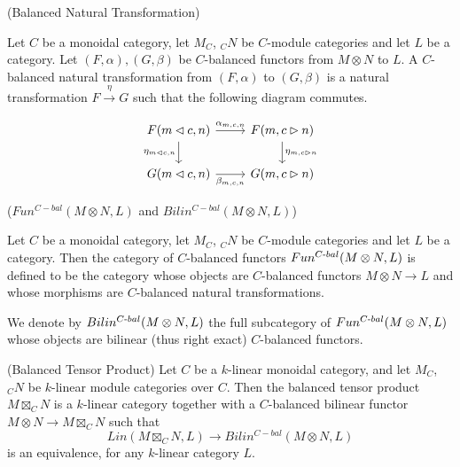 \begin{definition} (Balanced Natural Transformation)

  \noindent Let $C$ be a monoidal category, let $M_{C}$, $_{C}N$ be $C$-module categories and let $L$ be a category. Let $(F,\alpha), (G,\beta)$ be $C$-balanced functors from $M \otimes N$ to $L$. A $C$-balanced natural transformation
  from $(F,\alpha)$ to $(G,\beta)$ is a natural transformation $ F \xrightarrow{\eta} G$ such
  that the following diagram commutes.

  \[
    \begin{tikzcd}
      F(m \lhd c, n) \arrow[r, "\alpha_{m,c,n}"] \arrow[d, "\eta_{m \lhd c, n}"'] &
      F(m, c \rhd n) \arrow[d, "\eta_{m, c \rhd n}"] \\
      G(m \lhd c, n) \arrow[r, "\beta_{m,c,n}"'] &
      G(m, c \rhd n)
    \end{tikzcd}
  \]
\end{definition}

\begin{definition} ($Fun^{C-bal}(M \otimes N, L)$ and $Bilin^{C-bal}(M \otimes N, L)$)

  \noindent Let $C$ be a monoidal category, let $M_{C}$, $_{C}N$ be $C$-module categories and let $L$ be a category. \quad Then the category of $C$-balanced functors
  $Fun^{C{\text -}bal}(M \otimes N, L)$ is defined to be the category whose
  objects are $C$-balanced functors
  $M \otimes N \to L$ and whose morphisms are $C$-balanced natural transformations.

 We denote by $Bilin^{C{\text -}bal}(M \otimes N, L)$ the full subcategory of $Fun^{C{\text -}bal}(M \otimes N, L)$ whose objects are bilinear (thus right exact) $C$-balanced functors.
\end{definition}

\begin{definition}\label{definition/balanced-tensor-product} (Balanced Tensor Product)
  \noindent Let $C$ be a $k$-linear monoidal category, and let $M_C$, $_{C}N$ be $k$-linear module categories over $C$.
  \quad Then the balanced tensor product $M \boxtimes_{C} N$ is a $k$-linear
  category together with a $C$-balanced bilinear functor
  $M\otimes N\to M\boxtimes_{C} N$ such
  that \[Lin(M \boxtimes_{C} N, L) \to Bilin^{C-bal}(M \otimes N, L)\] is an
  equivalence, for any $k$-linear category $L$.
\end{definition}%


